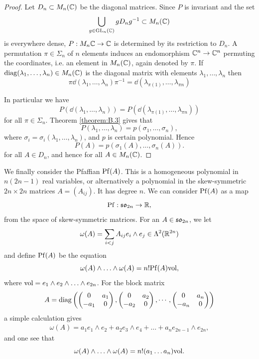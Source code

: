 \begin{proof}
  Let $D_n\subset M_n({\mathbb{C}})$ be the diagonal matrices. Since $P$ is invariant and the set 
  \[
    \bigcup_{g\in\mathrm{GL}_n({\mathbb{C}})} gD_ng^{-1}\subset M_n({\mathbb{C}})
  \]
  is everywhere dense, $P:M_n{{\mathbb{C}}}\to {\ensuremath{\mathbb{C}}}$ is determined by its restriction to $D_n$.
  A permutation $\pi\in\Sigma_n$ of $n$ elements induces an endomorphism ${\mathbb{C}}^n\to{\ensuremath{\mathbb{C}}}^n$
  permuting the coordinates, i.e. an element in $M_n({\mathbb{C}})$, again denoted by $\pi$. If
  $\operatorname{diag}(\lambda_1,\ldots,\lambda_n)\in M_n({\mathbb{C}})$ is the diagonal matrix with elements $\lambda_1,\ldots,\lambda_n$ 
  then
  \[
    \pi\dd(\lambda_1, \ldots, \lambda_n)\pi^{-1}
    = \dd(\lambda_{\pi(1)}, \ldots, \lambda_{\pi{n}})
  \]

  In particular we have 
  \[
    P(\!\dd(\lambda_1, \ldots, \lambda_n))
    = P(\!\dd(\lambda_{\pi(1)}, \ldots, \lambda_{\pi{n}}))
  \]
  for all $\pi\in\Sigma_n$. Theorem \ref{theorem:B.3} gives that 
  \[
    P(\lambda_1, \ldots, \lambda_n) = p(\sigma_1, \ldots, \sigma_n),
  \]
  where $\sigma_i=\sigma_i(\lambda_1,\ldots,\lambda_n)$, and $p$ is certain polynomial. Hence 
  \[
    P(A) = p(\sigma_1(A),\ldots, \sigma_n(A)).
  \]
  for all $A\in D_n$, and hence for all $A\in M_n({\mathbb{C}})$.
\end{proof}

We finally consider the Pfaffian $\mathrm{Pf}(A)$. This is a homogeneous polynomial in
$n(2n - 1)$ real variables, or alternatively a polynomial in the skew-symmetric
$2n\times 2n$ matrices $A = (A_{ij})$. It has degree $n$. We can consider $\mathrm{Pf}(A)$ as a map
\[
  \mathrm{Pf}:\mathfrak{so}_{2n}\to {\ensuremath{\mathbb{R}}},
\]
from the space of skew-symmetric matrices. For an $A\in\mathfrak{so}_{2n}$, we let 
\[
  \omega(A) = \sum_{i<j} A_{ij} e_i\wedge e_j \in \Lambda^2({\mathbb{R}}^{2n})
\]
and define $\mathrm{Pf}(A)$ be the equation 
\[
  \omega(A)\wedge\ldots\wedge\omega(A) = n!\mathrm{Pf}(A)\mathrm{vol},
\]
where $\mathrm{vol}=e_1\wedge e_2\wedge\ldots\wedge e_{2n}$. For the block matrix 
\[
  A = \operatorname{diag}\left(
    \begin{pmatrix}
      0 & a_1 \\
      -a_1 & 0
    \end{pmatrix},
    \begin{pmatrix}
      0 & a_2 \\
      -a_2 & 0
    \end{pmatrix},
    \cdots,
    \begin{pmatrix}
      0 & a_n \\
      -a_n & 0
    \end{pmatrix}
  \right)
\]
a simple calculation gives 
\begin{align}\label{eq:B.4}
  \omega(A) = a_1e_1\wedge e_2 + a_2e_3\wedge e_4 + \ldots + a_ne_{2n-1}\wedge e_{2n},
\end{align}
and one see that 
\[
  \omega(A)\wedge\ldots\wedge\omega(A) = n!(a_1\ldots a_n)\mathrm{vol}.
\]

